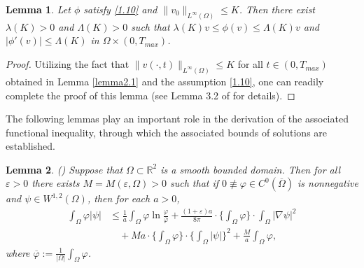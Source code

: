 \documentclass[12pt]{article}
\theoremstyle{plain}
\newtheorem{lemma}{Lemma}[section]
\theoremstyle{definition}
\numberwithin{equation}{section}
\begin{document}
\begin{lemma}\label{lemma2.2}Let  $\phi$  satisfy \eqref{1.10} and $ \|v_{0}\|_{L^{\infty}(\Omega)}\leq K$. Then there exist $\lambda(K)>0$
 and $\Lambda(K)>0$ such that $\lambda(K)v\leq \phi(v)\leq \Lambda(K)v $ and $|\phi'(v)|\leq \Lambda(K)$ in $\Omega\times (0,T_{max})$.
\end{lemma}
\begin{proof} Utilizing the fact that  $\|v(\cdot,t)\|_{L^\infty(\Omega)}\leq K$ for all $ t\in(0,T_{max})$ obtained in Lemma \ref{lemma2.1} and the assumption  \eqref{1.10}, one can readily complete the proof of this lemma (see Lemma 3.2 of \cite{WinklerAIHP} for details).
\end{proof}
 The following lemmas  play an important role in the derivation of the associated  functional inequality, through which  the associated bounds of solutions are established. %

\begin{lemma}\label{lemma2.3}
(\cite [Lemma 2.2 and Lemma 2.3] {Winkler(2020)})
	Suppose that $\Omega \subset\mathbb{R}^{2}$ is a smooth bounded domain. Then
for all $\varepsilon>0$
there exists $M=M (\varepsilon, \Omega)>0$ such that if $0 \not\equiv \varphi \in C^{0}(\overline\Omega )$ is nonnegative and $\psi\in W^{1,2}(\Omega)$, then for each $a>0$,
\begin{equation}\label{2.7}
		\begin{split}
			\int_{\Omega}\varphi | \psi | &\leq \frac{1}{a}\int_{\Omega}\varphi \ln\frac{ \varphi}{\overline{\varphi}}+ \frac{(1 + \varepsilon )a}{8\pi} \cdot \biggl\{\int_{\Omega}\varphi \biggr\} \cdot\int_{\Omega} | \nabla \psi |^{2}\\
			&\quad+M a\cdot \biggl\{\int_{\Omega} \varphi \biggr\} \cdot \biggl\{ \int_{\Omega}| \psi | \biggr\}^{2}+\frac{M}{a}\int_{\Omega}\varphi ,
		\end{split}
	\end{equation}
where $\overline{\varphi}:= \frac{1}{|\Omega |}\int_{\Omega} \varphi$.
\end{lemma}
\end{document}
